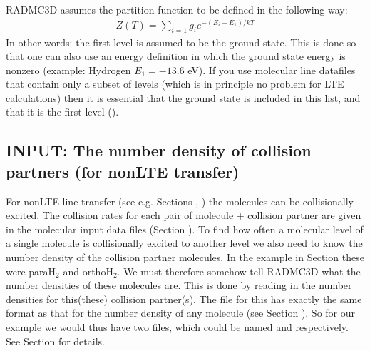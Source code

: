 \documentclass[letterpaper,10pt,english]{sphinxmanual}
\begin{document}
 RADMC\sphinxhyphen{}3D assumes the partition function to be defined in the following
way:
\begin{equation*}
\begin{split}Z(T) = \sum_{i=1} g_ie^{-(E_i-E_1)/kT}\end{split}
\end{equation*}
In other words: the first level is assumed to be the ground state. This is done
so that one can also use an energy definition in which the ground state energy
is non\sphinxhyphen{}zero (example: Hydrogen \(E_1=-13.6\) eV). If you use molecular line
datafiles that contain only a subset of levels (which is in principle no problem
for LTE calculations) then it is essential that the ground state is included in
this list, and that it is the first level ().


\subsection{INPUT: The number density of collision partners (for non\sphinxhyphen{}LTE transfer)}
\label{\detokenize{lineradtrans:input-the-number-density-of-collision-partners-for-non-lte-transfer}}\label{\detokenize{lineradtrans:sec-collpartner}}
For non\sphinxhyphen{}LTE line transfer (see e.g. Sections {\hyperref[\detokenize{lineradtrans:sec-lvg}]{}},
{\hyperref[\detokenize{lineradtrans:sec-optthinpop}]{}}) the molecules can be collisionally excited. The collision
rates for each pair of molecule + collision partner are given in the molecular
input data files (Section {\hyperref[\detokenize{lineradtrans:sec-molecule-xxx-inp}]{}}). To find how often a
molecular level of a single molecule is collisionally excited to another level
we also need to know the number density of the collision partner molecules. In
the example in Section {\hyperref[\detokenize{lineradtrans:sec-molecule-xxx-inp}]{}} these were para\sphinxhyphen{}H\(_2\)
and ortho\sphinxhyphen{}H\(_2\). We must therefore somehow tell RADMC\sphinxhyphen{}3D what the number
densities of these molecules are. This is done by reading in the number
densities for this(these) collision partner(s).  The file for this has exactly
the same format as that for the number density of any molecule (see Section
{\hyperref[\detokenize{lineradtrans:sec-mol-numdensity}]{}}). So for our example we would thus have two files,
which could be named  and 
respectively.  See Section {\hyperref[\detokenize{lineradtrans:sec-mol-numdensity}]{}} for details.
\end{document}
